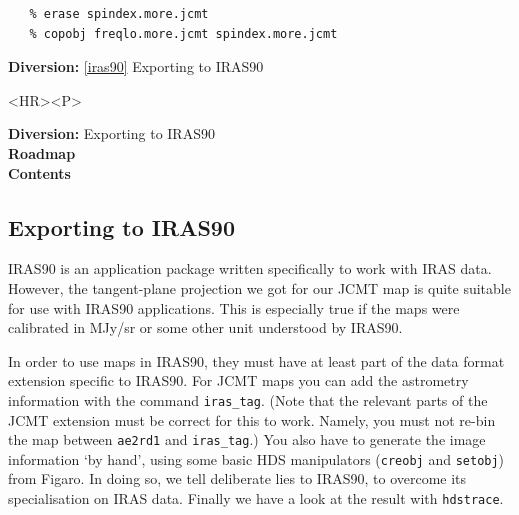 \documentclass[11pt]{article}
\newenvironment{latexonly}{}{}
\newcommand{\htmlref}[2]{#1}
\newcommand{\xref}[3]{#1}
\newcommand{\xlabel}[1]{}
\begin{document}
\begin{verbatim}
   % erase spindex.more.jcmt
   % copobj freqlo.more.jcmt spindex.more.jcmt
\end{verbatim}

\begin{latexonly}
{\bf Diversion:} \ref{iras90} Exporting to IRAS90\\
\end{latexonly}

\begin{htmlonly}
\begin{rawhtml} <HR><P> \end{rawhtml}
{\bf \htmlref{Diversion:}{iras90}} Exporting to IRAS90\\
{\bf \htmlref{Roadmap}{roadmap}}\\
{\bf \htmlref{Contents}{stardoccontents}}\\
\end{htmlonly}


\subsection{\label{iras90}\xlabel{iras90}Exporting to IRAS90}

\xref{IRAS90}{sun163}{}
   is an application package written specifically to work with IRAS
   data. However, the
\htmlref{tangent-plane projection we got for our JCMT map}{ae2rd}
   is quite suitable for use
   with IRAS90 applications. This is especially true if the maps were
\htmlref{calibrated in MJy/sr}{calib}
   or some other unit understood by IRAS90.

   In order to use maps in IRAS90, they must have at least part
   of the data format extension specific to IRAS90. For JCMT maps you
   can add the astrometry information with the command
{\tt \xref{iras\_tag}{sun132}{IRAS_TAG}}.
   (Note that the relevant parts of the JCMT extension must be correct
   for this to work. Namely, you must not re-bin the map between
{\tt \xref{ae2rd1}{sun132}{AE2RD1}}
   and {\tt iras\_tag}.) You also have to generate the image information
   `by hand', using some basic HDS manipulators
({\tt \xref{creobj}{sun86}{CREOBJ}}
   and
{\tt \xref{setobj}{sun86}{SETOBJ}})
   from
\xref{Figaro.}{sun86}{}
   In doing so, we tell deliberate lies to IRAS90, to overcome its
   specialisation on IRAS data. Finally we have a look at the result with
{\tt \xref{hdstrace}{sun102}{}}.
\end{document}
